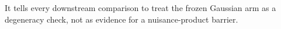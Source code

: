 It tells every downstream comparison to treat the frozen Gaussian arm as a degeneracy check, not as evidence for a nuisance-product barrier.
